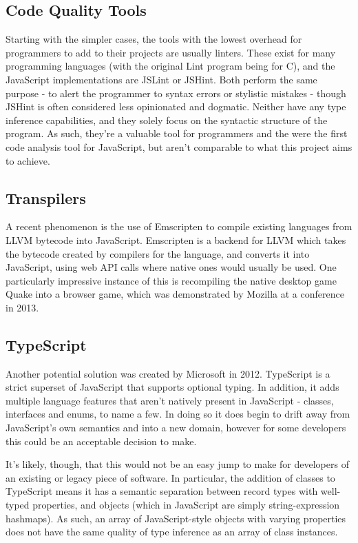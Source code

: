\documentclass[british, twoside]{bhamthesis}
\theoremstyle{definition}
\begin{document}
  \subsection{Code Quality Tools}

    Starting with the simpler cases, the tools with the lowest overhead for programmers to add to their projects are usually linters. These exist for many programming languages (with the original Lint program being for C), and the JavaScript implementations are JSLint or JSHint. Both perform the same purpose - to alert the programmer to syntax errors or stylistic mistakes - though JSHint is often considered less opinionated and dogmatic. Neither have any type inference capabilities, and they solely focus on the syntactic structure of the program. As such, they're a valuable tool for programmers and the were the first code analysis tool for JavaScript, but aren't comparable to what this project aims to achieve.

  \subsection{Transpilers}

    A recent phenomenon is the use of Emscripten\autocite{Zakai} to compile existing languages from LLVM bytecode into JavaScript. Emscripten is a backend for LLVM which takes the bytecode created by compilers for the language, and converts it into JavaScript, using web API calls where native ones would usually be used. One particularly impressive instance of this is recompiling the native desktop game Quake into a browser game, which was demonstrated by Mozilla at a conference in 2013\autocite{unrealengine}.

  \subsection{TypeScript}

    Another potential solution was created by Microsoft in 2012. TypeScript is a strict superset of JavaScript that supports optional typing. In addition, it adds multiple language features that aren't natively present in JavaScript - classes, interfaces and enums, to name a few. In doing so it does begin to drift away from JavaScript's own semantics and into a new domain, however for some developers this could be an acceptable decision to make.

    It's likely, though, that this would not be an easy jump to make for developers of an existing or legacy piece of software. In particular, the addition of classes to TypeScript means it has a semantic separation between record types with well-typed properties, and objects (which in JavaScript are simply string-expression hashmaps). As such, an array of JavaScript-style objects with varying properties does not have the same quality of type inference as an array of class instances.
\end{document}
